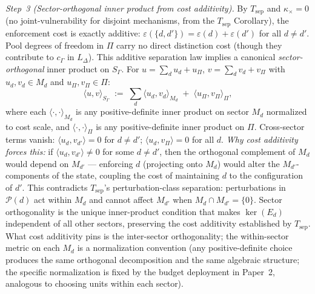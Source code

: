 \documentclass[11pt]{article}
\theoremstyle{remark}
\begin{document}
\begin{tcolorbox}[apfbox, title={Theorem $T_{\mathrm{adj}}$ --- Bridge Step 1: $*$-Involution from Cost Symmetry}]
\textit{Step~3 (Sector-orthogonal inner product from cost additivity).}  By $T_{\mathrm{sep}}$ and $\kappa_\times = 0$ (no joint-vulnerability for disjoint mechanisms, from the $T_{\mathrm{sep}}$ Corollary), the enforcement cost is exactly additive: $\varepsilon(\{d, d'\}) = \varepsilon(d) + \varepsilon(d')$ for all $d \ne d'$.  Pool degrees of freedom in $\Pi$ carry no direct distinction cost (though they contribute to $c_\Gamma$ in $L_\Delta$).  This additive separation law implies a canonical \emph{sector-orthogonal} inner product on $S_\Gamma$.  For $u = \sum_d u_d + u_\Pi$, $v = \sum_d v_d + v_\Pi$ with $u_d, v_d \in M_d$ and $u_\Pi, v_\Pi \in \Pi$:
\begin{equation}\label{eq:canon_ip}
\langle u, v \rangle_{S_\Gamma} \;:=\; \sum_d \langle u_d, v_d \rangle_{M_d} \;+\; \langle u_\Pi, v_\Pi \rangle_{\Pi},
\end{equation}
where each $\langle \cdot, \cdot \rangle_{M_d}$ is any positive-definite inner product on sector $M_d$ normalized to cost scale, and $\langle \cdot, \cdot \rangle_\Pi$ is any positive-definite inner product on $\Pi$.  Cross-sector terms vanish: $\langle u_d, v_{d'} \rangle = 0$ for $d \ne d'$; $\langle u_d, v_\Pi \rangle = 0$ for all $d$.  \emph{Why cost additivity forces this:}  if $\langle u_d, v_{d'} \rangle \ne 0$ for some $d \ne d'$, then the orthogonal complement of $M_d$ would depend on $M_{d'}$ --- enforcing $d$ (projecting onto $M_d$) would alter the $M_{d'}$-components of the state, coupling the cost of maintaining $d$ to the configuration of $d'$.  This contradicts $T_{\mathrm{sep}}$'s perturbation-class separation: perturbations in $\mathcal{P}(d)$ act within $M_d$ and cannot affect $M_{d'}$ when $M_d \cap M_{d'} = \{0\}$.  Sector orthogonality is the unique inner-product condition that makes $\ker(E_d)$ independent of all other sectors, preserving the cost additivity established by $T_{\mathrm{sep}}$.  What cost additivity pins is the inter-sector orthogonality; the within-sector metric on each $M_d$ is a normalization convention (any positive-definite choice produces the same orthogonal decomposition and the same algebraic structure; the specific normalization is fixed by the budget deployment in Paper~2, analogous to choosing units within each sector).


\end{tcolorbox}
\end{document}
